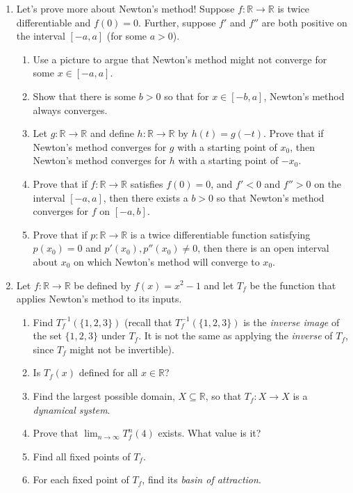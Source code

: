 \documentclass[letter]{article}
\newcommand{\R}{\mathbb{R}}
\begin{document}
\begin{enumerate}
		\item Let's prove more about Newton's method! Suppose $f:\R\to\R$ is twice differentiable and
			$f(0)=0$. Further, suppose $f'$ and $f''$ are both positive on the interval $[-a,a]$ (for
			some $a>0$). 
			\begin{enumerate}
				\item Use a picture to argue that Newton's method might not converge for some $x\in[-a,a]$.
				\item Show that there is some $b>0$ so that for $x\in[-b,a]$, Newton's method always converges.
				\item Let $g:\R\to\R$ and define $h:\R\to\R$ by $h(t)=g(-t)$. Prove that if Newton's method
					converges for $g$ with a starting point of $x_0$, then Newton's method converges
					for $h$ with a starting point of $-x_0$.
				\item Prove that if $f:\R\to\R$ satisfies $f(0)=0$, and $f' < 0$ and $f'' > 0$ on the interval
					$[-a,a]$, then there exists a $b>0$ so that Newton's method converges for
					$f$ on $[-a,b]$.
				\item Prove that if $p:\R\to\R$ is a twice differentiable function satisfying $p(x_0)=0$ and 
					$p'(x_0),p''(x_0)\neq 0$, then there is an open interval about $x_0$ on which Newton's
					method will converge to $x_0$.
			\end{enumerate}

		\item Let $f:\R\to\R$ be defined by $f(x)=x^2-1$ and let $T_f$ be the function that applies Newton's method
			to its inputs.
			\begin{enumerate}
				\item Find $T_f^{-1}(\{1,2,3\})$ (recall that $T_f^{-1}(\{1,2,3\})$ is the \emph{inverse image}
					of the set $\{1,2,3\}$ under $T_f$. It is not the same as applying the \emph{inverse}
					of $T_f$, since $T_f$ might not be invertible).
				\item Is $T_f(x)$ defined for all $x\in \R$?
				\item Find the largest possible domain, $X\subseteq \R$, so that $T_f:X\to X$ is a \emph{dynamical
					system}.
				\item Prove that $\lim_{n\to\infty} T^n_f(4)$ exists. What value is it?
				\item Find all fixed points of $T_f$.
				\item For each fixed point of $T_f$, find its \emph{basin of attraction}.
			\end{enumerate}


\end{enumerate}
\end{document}
